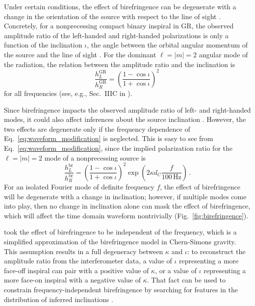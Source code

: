 \documentclass[aps,prd,twocolumn,superscriptaddress,preprintnumbers,nofootinbib]{revtex4-2}
\begin{document}
Under certain conditions, the effect of birefringence can be degenerate with a change in the orientation of the source with respect to the line of sight \cite{Alexander:2009tp}.
Concretely, for a nonprecessing compact binary inspiral in \ac{GR}, the observed amplitude ratio of the left-handed and right-handed polarizations is only a function of the inclination $\iota$, the angle between the orbital angular momentum of the source and the line of sight \cite{Blanchet:2013haa}.
For  the dominant $\ell = |m| = 2$ angular mode of the radiation, the relation between the amplitude ratio and the inclination is
\begin{equation}
    \frac{h_{L}^\mathrm{GR}}{h^\mathrm{GR}_{R}}=\left(\frac{1-\cos\iota}{1+\cos\iota}\right)^2\,
\end{equation}
for all frequencies (see, e.g., Sec.~IIIC in \cite{Isi:2022mbx}).

Since birefringence impacts the observed amplitude ratio of left- and right-handed modes, it could also affect inferences about the source inclination \cite{Alexander:2009tp}.
However, the two effects are degenerate only if the frequency dependence of Eq.~\eqref{eq:waveform_modification} is neglected.
This is easy to see from Eq.~\eqref{eq:waveform_modification}, since the implied polarization ratio for the $\ell = |m| = 2$ mode of a nonprecessing source is
\begin{equation}
    \frac{h_{L}^\mathrm{br}}{h_{R}^\mathrm{br}}=\left(\frac{1-\cos\iota}{1+\cos\iota}\right)^2
    \exp\left(2\kappa d_C \frac{f}{100\, \mathrm{Hz}}\right)\, .
    \label{eq:modified_amplitude_ratio}
\end{equation}
For an isolated Fourier mode of definite frequency $f$, the effect of birefringence will be degenerate with a change in inclination; however, if multiple modes come into play, then no change in inclination alone can mask the effect of birefringence, which will affect the time domain waveform nontrivially (Fig.~\ref{fig:birefringence}).

\citet{Okounkova_2022} took the effect of birefringence to be independent of the frequency, which is a simplified approximation of the birefringence model in Chern-Simons gravity.
This assumption results in a full degeneracy between $\kappa$ and $\iota$:
to reconstruct the amplitude ratio from the interferometer data, a value of $\iota$ representing a more face-off inspiral can pair with a positive value of $\kappa$, or a value of $\iota$ representing a more face-on inspiral with a negative value of $\kappa$.
That fact can be used to constrain frequency-independent birefringence by searching for features in the distribution of inferred inclinations \cite{Okounkova_2022}.
\end{document}
